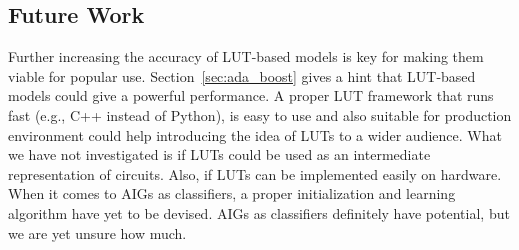 \subsection{Future Work}
Further increasing the accuracy of LUT-based models is key for making them viable for popular use. Section~\ref{sec:ada_boost} gives a hint that LUT-based models could give a powerful performance. A proper LUT framework that runs fast (e.g., C++ instead of Python), is easy to use and also suitable for production environment could help introducing the idea of LUTs to a wider audience. What we have not investigated is if LUTs could be used as an intermediate representation of circuits. Also, if LUTs can be implemented easily on hardware. When it comes to AIGs as classifiers, a proper initialization and learning algorithm have yet to be devised. AIGs as classifiers definitely have potential, but we are yet unsure how much.

